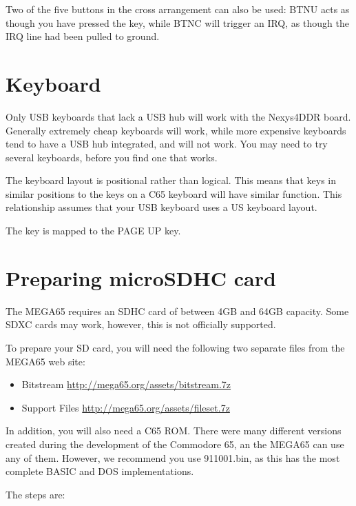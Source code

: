 Two of the five buttons in the cross arrangement can also be used:  BTNU acts as though you have pressed the  key, while BTNC will trigger an IRQ, as though the IRQ line had been pulled to ground.

\section{Keyboard}

Only USB keyboards that lack a USB hub will work with the Nexys4DDR board.  Generally extremely cheap keyboards will work, while more expensive keyboards tend to have a USB hub integrated, and will not work.  You may need to try several keyboards, before you find one that works.

The keyboard layout is positional rather than logical.
This means that keys in similar positions to the keys on a C65 keyboard will have similar function.
This relationship assumes that your USB keyboard uses a US keyboard layout.

The  key is mapped to the PAGE UP key.

\section{Preparing microSDHC card}

The MEGA65 requires an SDHC card of between 4GB and 64GB capacity.  Some SDXC cards may work, however, this is not officially supported.

To prepare your SD card, you will need the following two separate files from the MEGA65 web site:

\begin{itemize}
\item{Bitstream} \url{http://mega65.org/assets/bitstream.7z}
\item{Support Files} \url{http://mega65.org/assets/fileset.7z}
\end{itemize}

In addition, you will also need a C65 ROM.  There were many different versions created during the development of the Commodore 65,
an the MEGA65 can use any of them.  However, we recommend you use 911001.bin, as this has the most complete BASIC and DOS implementations.

The steps are:

